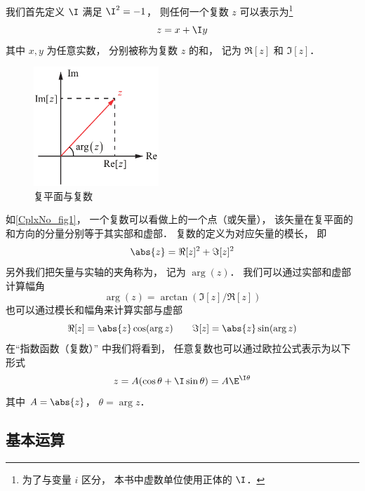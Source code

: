 

我们首先定义 $\I$ 满足 $\I^2 = -1$， 则任何一个复数 $z$ 可以表示为\footnote{为了与变量 $i$ 区分， 本书中虚数单位使用正体的 $\I$．}
\begin{equation}
z = x + \I y
\end{equation}
其中 $x,y$ 为任意实数， 分别被称为复数 $z$ 的和， 记为 $\Re[z]$ 和 $\Im[z]$．

\begin{figure}[ht]
\centering
\includegraphics[width=4.7cm]{./figures/CplxNo1.pdf}
\caption{复平面与复数} \label{CplxNo_fig1}
\end{figure}

如\autoref{CplxNo_fig1}， 一个复数可以看做上的一个点（或矢量）， 该矢量在复平面的和方向的分量分别等于其实部和虚部． 复数的定义为对应矢量的模长， 即
\begin{equation}
\abs{z} = \Re[z]^2 + \Im[z]^2
\end{equation}
另外我们把矢量与实轴的夹角称为， 记为 $\arg(z)$． 我们可以通过实部和虚部计算幅角%
\begin{equation}
\arg(z) = \arctan(\Im[z]/\Re[z])
\end{equation}
也可以通过模长和幅角来计算实部与虚部
\begin{equation}
\Re[z] = \abs{z}\cos(\arg z) \qquad \Im[z] = \abs{z}\sin(\arg z)
\end{equation}
在“指数函数（复数）” 中我们将看到， 任意复数也可以通过欧拉公式表示为以下形式
\begin{equation}
z = A(\cos\theta + \I\sin\theta) = A\E^{\I\theta}
\end{equation}
其中 $A = \abs{z}$， $\theta = \arg z$．

\subsection{基本运算}
